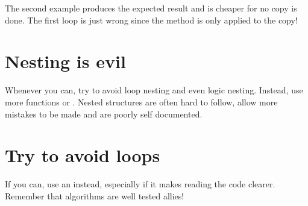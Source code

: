 
The second example produces the expected result and is cheaper for no copy is 
done. The first loop is just wrong since the  method is only 
applied to the copy!

\section{Nesting is evil}
Whenever you can, try to avoid loop nesting and even logic nesting. Instead, 
use more functions or . Nested structures are often hard 
to follow, allow more mistakes to be made and are poorly self documented.

\section{Try to avoid loops}
If you can, use an  instead, especially if it makes reading 
the code clearer. Remember that algorithms are well tested allies!